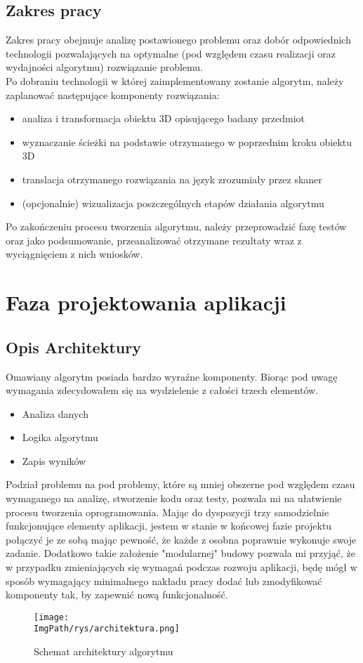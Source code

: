 \documentclass[a4paper,12pt,twoside,openany]{report}
\newcommand{\ImgPath}{.}
\begin{document}
  \section{Zakres pracy}
    Zakres pracy obejmuje analizę postawionego problemu oraz dobór odpowiednich technologii pozwalających 
    na optymalne (pod względem czasu realizacji oraz wydajności algorytmu) rozwiązanie problemu.
    \\
    Po dobraniu technologii w której zaimplementowany zostanie algorytm, należy zaplanować 
    następujące komponenty rozwiązania:
    \begin{itemize}
      \item analiza i transformacja obiektu 3D opisującego badany przedmiot
      \item wyznaczanie ścieżki na podstawie otrzymanego w poprzednim kroku obiektu 3D
      \item translacja otrzymanego rozwiązania na język zrozumiały przez skaner
      \item (opcjonalnie) wizualizacja poszczególnych etapów działania algorytmu
    \end{itemize}
    Po zakończeniu procesu tworzenia algorytmu, należy przeprowadzić fazę testów oraz jako podsumowanie, 
    przeanalizować otrzymane rezultaty wraz z wyciągnięciem z nich wniosków.

\chapter{Faza projektowania aplikacji}
  \section{Opis Architektury}
    Omawiany algorytm posiada bardzo wyraźne komponenty. Biorąc pod uwagę wymagania 
    zdecydowałem się na wydzielenie z całości trzech elementów. 
    \begin{itemize}
      \item Analiza danych
      \item Logika algorytmu
      \item Zapis wyników
    \end{itemize}
    Podział problemu na pod problemy, które są mniej obszerne pod względem czasu wymaganego na analizę, 
    stworzenie kodu oraz testy, pozwala mi na ułatwienie procesu tworzenia oprogramowania.
    Mając do dyspozycji trzy samodzielnie funkcjonujące elementy aplikacji, jestem w stanie 
    w końcowej fazie projektu połączyć je ze sobą mając pewność, że każde z osobna poprawnie 
    wykonuje swoje zadanie. Dodatkowo takie założenie "modularnej" budowy pozwala mi przyjąć, 
    że w przypadku zmieniających się wymagań podczas rozwoju aplikacji, będę mógł w sposób 
    wymagający minimalnego nakładu pracy dodać lub zmodyfikować komponenty tak, by zapewnić nową funkcjonalność.
    \begin{figure}[!htbp]
      \begin{center}
    \centering
    \texttt{[image: \\ImgPath/rys/architektura.png]}
    \end{center}
      \caption{Schemat architektury algorytmu}
      \label{schematArchitektury}
    \end{figure}
    \clearpage
\end{document}
